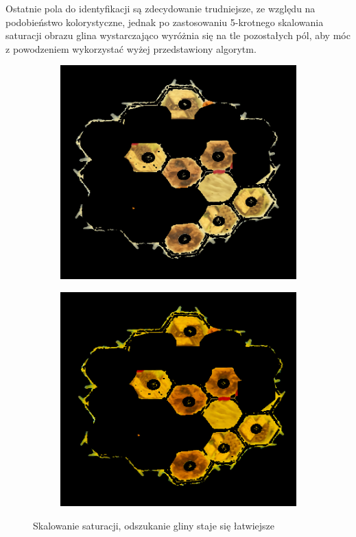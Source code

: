 \documentclass[a4paper]{article}
\begin{document}
Ostatnie pola do identyfikacji są zdecydowanie trudniejsze, ze względu na podobieństwo kolorystyczne, jednak po zastosowaniu 5-krotnego skalowania saturacji obrazu glina wystarczająco wyróżnia się na tle pozostałych pól, aby móc z powodzeniem wykorzystać wyżej przedstawiony algorytm.

	\begin{figure}[H]
        \begin{subfigure}[]{.5\linewidth}
        \includegraphics[width=\linewidth]{pictures/fields/pre_sat.png}

        \end{subfigure}
        \begin{subfigure}[]{0.5\linewidth}
        \includegraphics[width=\linewidth]{pictures/fields/after_sat.png}
        \end{subfigure}

        \caption{Skalowanie saturacji, odszukanie gliny staje się łatwiejsze}
        \label{fig:step6}
    \end{figure}
	
\end{document}
